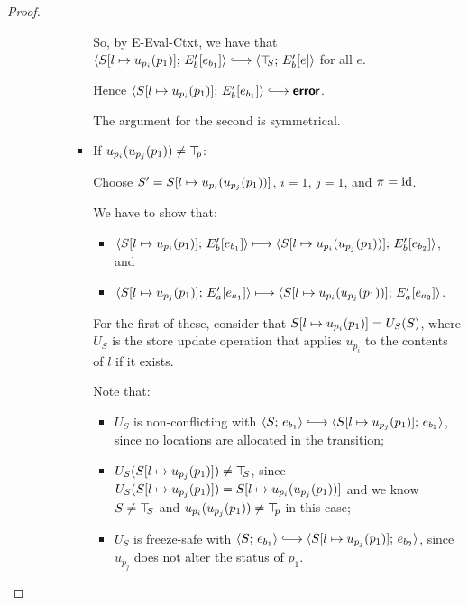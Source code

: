 \begin{proof}
\begin{enumerate}
\begin{enumerate}
\begin{itemize}
\begin{itemize}
          So, by {\sc E-Eval-Ctxt}, we have that
          $\config{\extSRaw{S}{l}{u_{p_i}(p_1)}}{\evalctxt{E'_b}{e_{b_1}}}
          \parstepsto \config{\topS}{\evalctxt{E'_b}{e}}$ for all $e$.

          Hence
          $\config{\extSRaw{S}{l}{u_{p_i}(p_1)}}{\evalctxt{E'_b}{e_{b_1}}}
          \parstepsto \error$.

          The argument for the second is symmetrical.

        \item If $u_{p_i}(u_{p_j}(p_1)) \neq \top\hspace{-0.85mm}_{p}$:

          Choose $S' = S[l \mapsto u_{p_i}(u_{p_j}(p_1))]$, $i =
          1$, $j = 1$, and $\pi = \mathrm{id}$.

          We have to show that:
          \begin{itemize}
          \item
            $\langle S[l \mapsto u_{p_i}(p_1)];\, E'_b\hspace{-0.5mm}\left[e_{b_1}\right] \rangle
            \longmapsto
            \langle S[l \mapsto u_{p_i}(u_{p_j}(p_1))];\, E'_b\hspace{-0.5mm}\left[e_{b_2}\right] \rangle$,
            and
          \item
            $\langle S[l \mapsto u_{p_j}(p_1)];\, E'_a\hspace{-0.5mm}\left[e_{a_1}\right] \rangle
            \longmapsto
            \langle S[l \mapsto u_{p_i}(u_{p_j}(p_1))];\, E'_a\hspace{-0.5mm}\left[e_{a_2}\right] \rangle$.
          \end{itemize}

          For the first of these, consider that
          $S[l \mapsto u_{p_i}(p_1)] = U_S(S)$, where $U_S$ is the
          store update operation that applies $u_{p_i}$ to the
          contents of $l$ if it exists.

          Note that:
          \begin{itemize}
          \item $U_S$ is non-conflicting with $\config{S}{e_{b_1}}
            \parstepsto
            \config{\extSRaw{S}{l}{u_{p_j}(p_1)}}{e_{b_2}}$, since no
            locations are allocated in the transition;
          \item $U_S(S[l \mapsto u_{p_j}(p_1)]) \neq \top\hspace{-0.85mm}_{S}$, since
            $U_S(S[l \mapsto u_{p_j}(p_1)]) =
            S[l \mapsto u_{p_i}(u_{p_j}(p_1))]$ and we know $S \neq
            \top\hspace{-0.85mm}_{S}$ and $u_{p_i}(u_{p_j}(p_1)) \neq \top\hspace{-0.85mm}_{p}$ in this
            case;
          \item $U_S$ is freeze-safe with $\config{S}{e_{b_1}}
            \parstepsto
            \config{\extSRaw{S}{l}{u_{p_j}(p_1)}}{e_{b_2}}$, since
            $u_{p_j}$ does not alter the status of $p_1$.


\end{itemize}
\end{itemize}
\end{itemize}
\end{enumerate}
\end{enumerate}
\end{proof}
